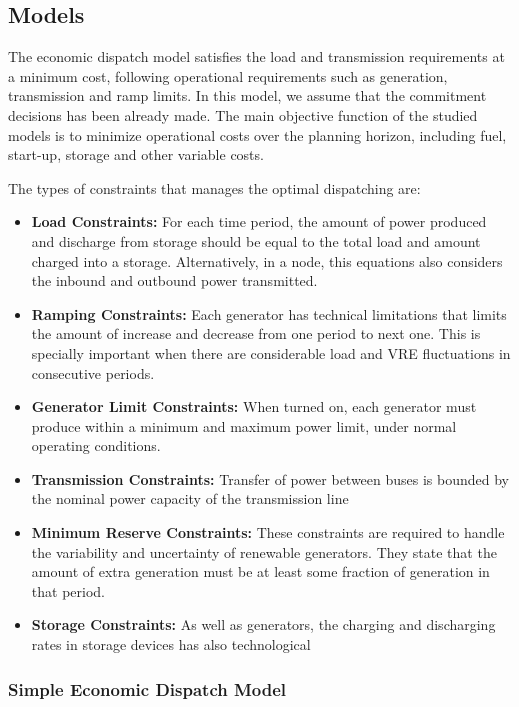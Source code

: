 \documentclass[12pt,LUDisStyle,twosided]{book}
\begin{document}
\subsection{Models}

The economic dispatch model satisfies the load and transmission requirements at a minimum cost, following operational requirements such as generation, transmission and ramp limits. In this model, we assume that the commitment decisions has been already made. The main objective function of the studied models is to minimize operational costs over the planning horizon, including fuel, start-up, storage and other variable costs.

The types of constraints that manages the optimal dispatching are:

\begin{itemize}
\item \textbf{Load Constraints:} For each time period, the amount of power produced and discharge from storage should be equal to the total load and amount charged into a storage. Alternatively, in a node, this equations also considers the inbound and outbound power transmitted.
\item \textbf{Ramping Constraints:}  Each generator has technical limitations that limits the amount of increase and decrease from one period to next one. This is specially important when there are considerable load and VRE fluctuations in consecutive periods.
\item \textbf{Generator Limit Constraints:} When turned on, each generator must produce within a minimum and maximum power limit, under normal operating conditions.
\item \textbf{Transmission Constraints:} Transfer of power between buses is bounded by the nominal power capacity of the transmission line
\item \textbf{Minimum Reserve Constraints:} These constraints are required to handle the variability and uncertainty of renewable generators. They state that the amount of extra generation must be at least some fraction of generation in that period.
\item \textbf{Storage Constraints:} As well as generators, the charging and discharging rates in storage devices has also technological 


\end{itemize}

\subsubsection{Simple Economic Dispatch Model}
\end{document}
